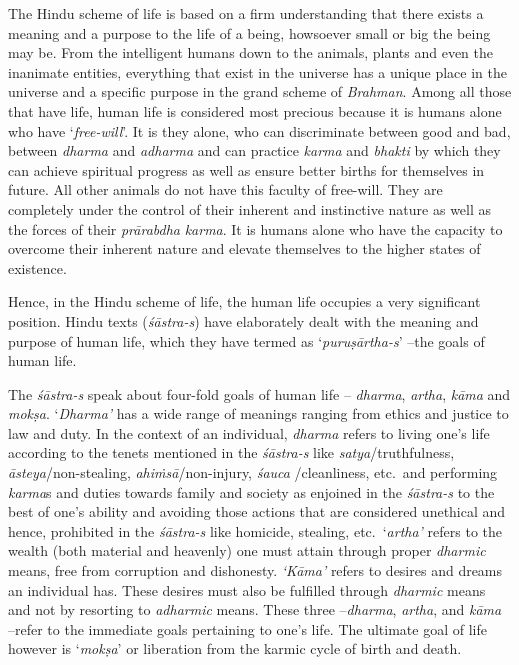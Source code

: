 The Hindu scheme of life is based on a firm understanding that there exists a meaning and a purpose to the life of a being, howsoever small or big the being may be. From the intelligent humans down to the animals, plants and even the inanimate entities, everything that exist in the universe has a unique place in the universe and a specific purpose in the grand scheme of \emph{Brahman}. Among all those that have life, human life is considered most precious because it is humans alone who have `\emph{free-will}'. It is they alone, who can discriminate between good and bad, between \emph{dharma} and \emph{adharma} and can practice \emph{karma} and \emph{bhakti} by which they can achieve spiritual progress as well as ensure better births for themselves in future. All other animals do not have this faculty of free-will. They are completely under the control of their inherent and instinctive nature as well as the forces of their \emph{prārabdha} \emph{karma}. It is humans alone who have the capacity to overcome their inherent nature and elevate themselves to the higher states of existence.
\vskip 4pt

Hence, in the Hindu scheme of life, the human life occupies a very significant position. Hindu texts (\emph{śāstra-s}) have elaborately dealt with the meaning and purpose of human life, which they have termed as `\emph{puruṣārtha-s}' --the goals of human life.
\vskip 4pt

The \emph{śāstra-s} speak about four-fold goals of human life -- \emph{dharma}, \emph{artha}, \emph{kāma} and \emph{mokṣa}. `\emph{Dharma'} has a wide range of meanings ranging from ethics and justice to law and duty. In the context of an individual, \emph{dharma} refers to living one's life according to the tenets mentioned in the \emph{śāstra-s} like \emph{satya}/truthfulness, \emph{āsteya}/non-stealing, \emph{ahiṁsā}/non-injury, \emph{śauca} /cleanliness, etc.\ and performing \emph{karma}s and duties towards family and society as enjoined in the \emph{śāstra-s} to the best of one's ability and avoiding those actions that are considered unethical and hence, prohibited in the \emph{śāstra-s} like homicide, stealing, etc.\ `\emph{artha'} refers to the wealth (both material and heavenly) one must attain through proper \emph{dharmic} means, free from corruption and dishonesty. \emph{`Kāma'} refers to desires and dreams an individual has. These desires must also be fulfilled through \emph{dharmic} means and not by resorting to \emph{adharmic} means. These three --\emph{dharma}, \emph{artha}, and \emph{kāma} --refer to the immediate goals pertaining to one's life. The ultimate goal of life however is `\emph{mokṣa}' or liberation from the karmic cycle of birth and death.
\vskip 4pt


